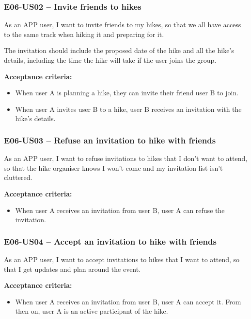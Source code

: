 
\subsubsection*{E06-US02 -- Invite friends to hikes}
As an APP user, I want to invite friends to my hikes, so that we all have access to the same track when hiking it and preparing for it.

The invitation should include the proposed date of the hike and all the hike's details, including the time the hike will take if the user joins the group.

\textbf{Acceptance criteria:}
\begin{itemize}
    \item When user A is planning a hike, they can invite their friend user B to join. 
    \item When user A invites user B to a hike, user B receives an invitation with the hike's details.
\end{itemize}

\subsubsection*{E06-US03 -- Refuse an invitation to hike with friends}
As an APP user, I want to refuse invitations to hikes that I don't want to attend, so that the hike organiser knows I won't come and my invitation list isn't cluttered.

\textbf{Acceptance criteria:}
\begin{itemize}
    \item When user A receives an invitation from user B, user A can refuse the invitation.
\end{itemize}

\subsubsection*{E06-US04 -- Accept an invitation to hike with friends}
As an APP user, I want to accept invitations to hikes that I want to attend, so that I get updates and plan around the event.

\textbf{Acceptance criteria:}
\begin{itemize}
    \item When user A receives an invitation from user B, user A can accept it. From then on, user A is an active participant of the hike.
\end{itemize}

